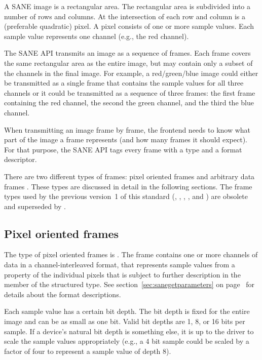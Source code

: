 \documentclass[11pt,DVIps]{report}
\begin{document}
A SANE image is a rectangular area.  The rectangular area is subdivided into a
number of rows and columns.  At the intersection of each row and column is a
(preferable quadratic) pixel. A pixel consists of one or more sample values.
Each sample value represents one channel (e.g., the red channel).

The SANE API transmits an image as a sequence of frames.  Each frame covers
the same rectangular area as the entire image, but may contain only a subset
of the channels in the final image.  For example, a red/green/blue image could
either be transmitted as a single frame that contains the sample values for
all three channels or it could be transmitted as a sequence of three frames:
the first frame containing the red channel, the second the green channel, and
the third the blue channel.

When transmitting an image frame by frame, the frontend needs to know what
part of the image a frame represents (and how many frames it should expect).
For that purpose, the SANE API tags every frame with a type and a format
descriptor.

\begin{changebar}
  There are two different types of frames: pixel oriented frames
   and arbitrary data frames
  . These types are discussed in detail in the
  following sections. The frame types used by the previous version~1 of this
  standard (, ,
  , , and
  ) are obsolete and superseded by
  .

  \subsection{Pixel oriented frames}

  The type of pixel oriented frames is . The
  frame contains one or more channels of data in a channel-interleaved format,
  that represents sample values from a property of the individual pixels that
  is subject to further description in the  member of the
   structured type. See section~\ref{sec:sanegetparameters}
  on page~\pageref{sec:sanegetparameters} for details about the format
  descriptions.
\end{changebar}

  Each sample value has a certain bit depth.  The bit depth is fixed for the
  entire image and can be as small as one bit. Valid bit depths are 1, 8, or
  16 bits per sample. If a device's natural bit depth is something else, it is
  up to the driver to scale the sample values appropriately (e.g., a 4 bit
  sample could be scaled by a factor of four to represent a sample value of
  depth 8).
\end{document}
